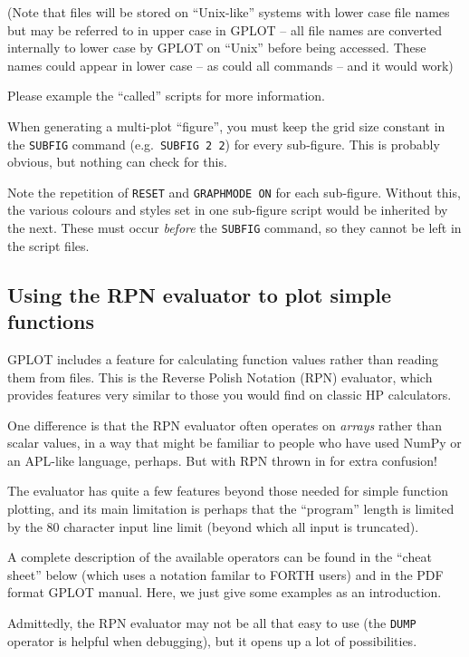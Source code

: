 \documentclass[a4paper,twoside,11pt]{article}
\newcommand{\newpara}{\par\vspace{4mm}\noindent}
\begin{document}
\newpara
(Note that files will be stored on ``Unix-like'' systems with lower case
file names but may be referred to in upper case in GPLOT -- all file
names are converted internally to lower case by GPLOT on ``Unix'' before
being accessed. These names could appear in lower case -- as could all
commands -- and it would work)

\newpara
Please example the ``called'' scripts for more information.

\newpara
When generating a multi-plot ``figure'', you must keep the grid size
constant in the \texttt{SUBFIG} command (e.g.~\texttt{SUBFIG\ 2\ 2}) for
every sub-figure. This is probably obvious, but nothing can check for
this.

\newpara
Note the repetition of \texttt{RESET} and \texttt{GRAPHMODE\ ON} for
each sub-figure. Without this, the various colours and styles set in one
sub-figure script would be inherited by the next. These must occur
\emph{before} the \texttt{SUBFIG} command, so they cannot be left in the
script files.


\subsection{Using the RPN evaluator to plot simple functions}\label{using-the-rpn-evaluator-to-plot-simple-functions}

\newpara
GPLOT includes a feature for calculating function values rather than
reading them from files. This is the Reverse Polish Notation (RPN)
evaluator, which provides features very similar to those you would find
on classic HP calculators.

\newpara
One difference is that the RPN evaluator often operates on \emph{arrays}
rather than scalar values, in a way that might be familiar to people who
have used NumPy or an APL-like language, perhaps. But with RPN thrown in
for extra confusion!

\newpara
The evaluator has quite a few features beyond those needed for simple
function plotting, and its main limitation is perhaps that the
``program'' length is limited by the 80 character input line limit
(beyond which all input is truncated).

\newpara
A complete description of the available operators can be found in the
``cheat sheet'' below (which uses a notation familar to FORTH users) and
in the PDF format GPLOT manual. Here, we just give some examples as an
introduction.

\newpara
Admittedly, the RPN evaluator may not be all that easy to use (the
\texttt{DUMP} operator is helpful when debugging), but it opens up a lot
of possibilities.
\end{document}
